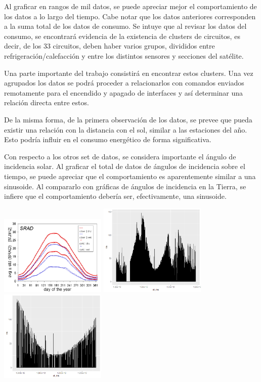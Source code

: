 \documentclass[../Main.tex]{subfiles}
\begin{document}
Al graficar en rangos de mil datos, se puede apreciar mejor el comportamiento de los datos a lo largo del tiempo. Cabe notar que los datos anteriores corresponden a la suma total de los datos de consumo. Se intuye que al revisar los datos del consumo, se encontrará evidencia de la existencia de clusters de circuitos, es decir, de los 33 circuitos, deben haber varios grupos, divididos entre refrigeración/calefacción y entre los distintos sensores y secciones del satélite.
\newline \par 
Una parte importante del trabajo consistirá en encontrar estos clusters. Una vez agrupados los datos se podrá proceder a relacionarlos con comandos enviados remotamente para el encendido y apagado de interfaces y así determinar una relación directa entre estos. 
\newline \par 
De la misma forma, de la primera observación de los datos, se prevee que pueda existir una relación con la distancia con el sol, similar a las estaciones del año. Esto podría influir en el consumo energético de forma significativa.
\newline \par 
Con respecto a los otros set de datos, se considera importante el ángulo de incidencia solar. Al graficar el total de datos de ángulos de incidencia sobre el tiempo, se puede apreciar que el comportamiento es aparentemente similar a una sinusoide. Al compararlo con gráficas de ángulos de incidencia en la Tierra, se infiere que el comportamiento debería ser, efectivamente, una sinusoide. 
\begin{center}
\includegraphics[width=2in]{Assets/srad_sm.png}
\includegraphics[width=2in]{Assets/saaf1saAll.png}
\includegraphics[width=2in]{Assets/saaf1500k850k.png}
\end{center}
\end{document}
